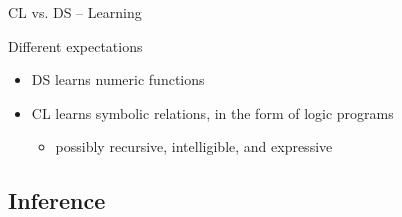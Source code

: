 \documentclass[presentation]{beamer}\mode<presentation>{\usetheme{AMSBolognaFC}}
\begin{document}
\begin{frame}[allowframebreaks]{CL vs. DS -- Learning}
    \begin{block}{Different expectations}
        \begin{itemize}
            \item DS learns numeric \alert{functions}
            \item CL learns symbolic \alert{relations}, in the form of \alert{logic programs}
            \begin{itemize}
                \item possibly \alert{recursive}, \alert{intelligible}, and expressive
            \end{itemize}
        \end{itemize}
    \end{block}
\end{frame}

\subsection{Inference}
\end{document}
